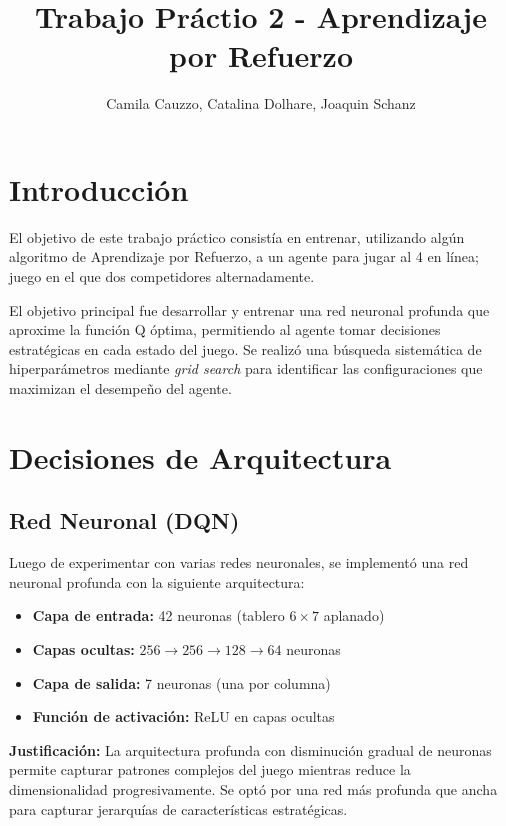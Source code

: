 \documentclass[11pt,a4paper]{article}
\title{\textbf{Trabajo Práctio 2 - Aprendizaje por Refuerzo} \vspace{-0.5cm}}
\author{Camila Cauzzo, Catalina Dolhare, Joaquin Schanz}
\date{}
\begin{document}
\maketitle
\vspace{-1cm}

\section{Introducción}

El objetivo de este trabajo práctico consistía en entrenar, utilizando algún algoritmo de Aprendizaje por Refuerzo, a un agente para jugar al 4 en línea; juego en el que dos competidores alternadamente.

El objetivo principal fue desarrollar y entrenar una red neuronal profunda que aproxime la función Q óptima, permitiendo al agente tomar decisiones estratégicas en cada estado del juego. Se realizó una búsqueda sistemática de hiperparámetros mediante \textit{grid search} para identificar las configuraciones que maximizan el desempeño del agente.

\section{Decisiones de Arquitectura}

\subsection{Red Neuronal (DQN)}
Luego de experimentar con varias redes neuronales, se implementó una red neuronal profunda con la siguiente arquitectura:

\begin{itemize}
    \item \textbf{Capa de entrada:} 42 neuronas (tablero $6 \times 7$ aplanado)
    \item \textbf{Capas ocultas:} $256 \rightarrow 256 \rightarrow 128 \rightarrow 64$ neuronas
    \item \textbf{Capa de salida:} 7 neuronas (una por columna)
    \item \textbf{Función de activación:} ReLU en capas ocultas
\end{itemize}

\textbf{Justificación:} La arquitectura profunda con disminución gradual de neuronas permite capturar patrones complejos del juego mientras reduce la dimensionalidad progresivamente. Se optó por una red más profunda que ancha para capturar jerarquías de características estratégicas.
\end{document}
